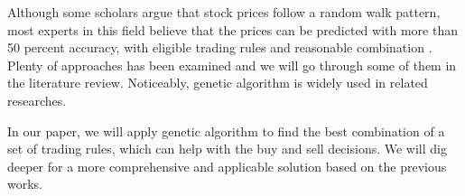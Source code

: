 \documentclass{article}
\begin{document}
Although some scholars argue that stock prices follow a random walk pattern,
most experts in this field believe that the prices can be predicted with more than 50 percent accuracy,
with eligible trading rules and reasonable combination \cite{stock-market-prediction-with-multiple-classifiers}.
Plenty of approaches has been examined and we will go through some of them in the literature review.
Noticeably, genetic algorithm is widely used in related researches.



In our paper, we will apply genetic algorithm to
find the best combination of a set of trading rules, which can help with the buy and sell decisions.
We will dig deeper for a more comprehensive and applicable solution based on the previous works.





\end{document}
